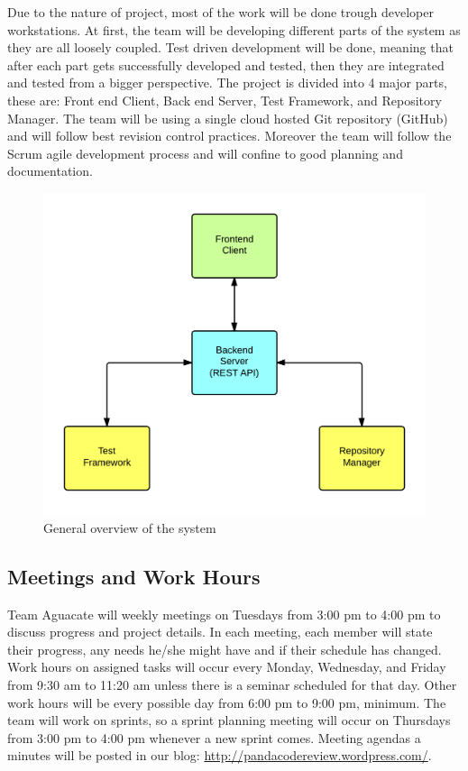 
Due to the nature of project, most of the work will be done trough developer
workstations. At first, the team will be developing different parts of the
system as they are all loosely coupled. Test driven development will be done,
meaning that after each part gets successfully developed and tested, then they
are integrated and tested from a bigger perspective. The project is divided into
4 major parts, these are: Front end Client, Back end Server, Test Framework, and
Repository Manager. The team will be using a single cloud hosted Git repository
(GitHub) and will follow best revision control practices. Moreover the team will
follow the Scrum agile development process and will confine to good planning and
documentation.

\begin{figure}[H]
	\centering
	\includegraphics[width=\textwidth]{img/bigArquitectOverview}
	\caption{General overview of the system}
\end{figure}

\subsection{Meetings and Work Hours}

Team Aguacate will weekly meetings on Tuesdays from 3:00 pm to 4:00 pm to
discuss progress and project details. In each meeting, each member will state
their progress, any needs he/she might have and if their schedule has changed.
Work hours on assigned tasks will occur every Monday, Wednesday, and Friday from
9:30 am to 11:20 am unless there is a seminar scheduled for that day. Other work
hours will be every possible day from 6:00 pm to 9:00 pm, minimum. The team will
work on sprints, so a sprint planning meeting will occur on Thursdays from 3:00
pm to 4:00 pm whenever a new sprint comes.  Meeting agendas a minutes will be
posted in our blog: \url{http://pandacodereview.wordpress.com/}.

